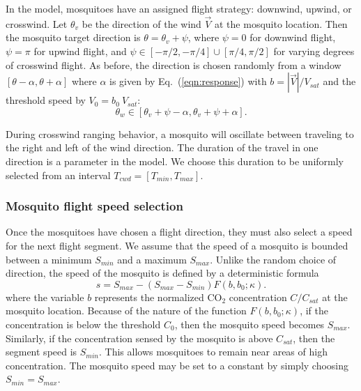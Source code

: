 \documentclass[12pt]{article}
\newif\ifcommentsw
\newcommand{\comment}[1]{\ifcommentsw  $\blacktriangleright$\ \textbf{#1}\ $\blacktriangleleft$ \fi}
\begin{document}
In the model, mosquitoes have an assigned flight strategy: downwind, upwind, or crosswind.
Let $\theta_v$ be the direction of the wind $\vec V$ at the mosquito location.  Then the mosquito target direction is $\theta = \theta_v + \psi$, where $\psi=0$ for downwind flight, $\psi=\pi$ for upwind flight, and $\psi \in [-\pi/2, -\pi/4] \cup [\pi/4,\pi/2]$ for varying degrees of crosswind flight.  As before, the direction is chosen randomly from a window
$[\theta-\alpha,\theta+\alpha]$ where $\alpha$ is given by Eq.~(\ref{eqn:response}) with $b = |\vec{V}|/V_{sat}$ and the threshold speed by $V_0 = b_0\ V_{sat}$:
\begin{equation*}
	\theta_w \in [\theta_v + \psi-\alpha,\theta_v + \psi+\alpha]. %
\end{equation*}

During crosswind ranging behavior, a mosquito will oscillate
between traveling to the right and left of the wind direction.
The duration of the travel in one direction is a parameter in
the model. We choose this duration to be uniformly selected
from an interval $T_{cwd} = [T_{min},T_{max}]$.
\comment{Bree - can you please elaborate on just what the cross wind behavior is.  I could not reproduce it from what we've described in this paragraph.  Thanks, MH}

\subsubsection{Mosquito flight speed selection}
Once the mosquitoes have chosen a flight direction, they must also select a speed for the next flight segment.  We assume that the speed of a mosquito is bounded between a minimum
$S_{min}$ and a maximum $S_{max}$.  Unlike the random choice of direction, the speed of the
 mosquito is defined by a deterministic formula
\begin{equation}\label{eqn:speed}
	s = S_{max} - (S_{max} -  S_{min})F(b, b_0; \kappa).
\end{equation}
where the variable $b$ represents the normalized CO$_2$ concentration $C/C_{sat}$ at the mosquito location.  Because of the nature of the function $F(b, b_0; \kappa)$, if the concentration is below the threshold $C_0$, then the mosquito speed becomes $S_{max}$.  Similarly, if the concentration sensed by the mosquito is above $C_{sat}$, then the segment speed is $S_{min}$.  This allows mosquitoes to remain near areas of high concentration.  The mosquito speed may be set to a constant by simply choosing $S_{min} = S_{max}$.
\end{document}
